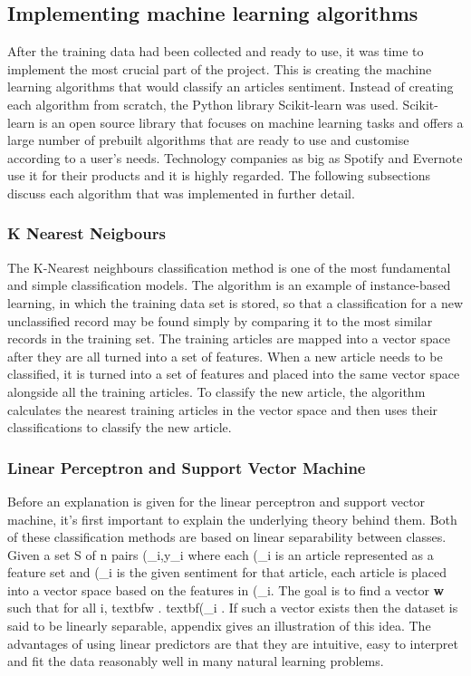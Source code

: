 \documentclass[a4paper,11pt]{report}
\begin{document}
\subsection{Implementing machine learning algorithms}
After the training data had been collected and ready to use, it was time to implement the most crucial part of the project. This is creating the machine learning algorithms that would classify an articles sentiment. Instead of creating each algorithm from scratch, the Python library Scikit-learn was used.  Scikit-learn is an open source library that focuses on machine learning tasks and offers a large number of prebuilt algorithms that are ready to use and customise according to a user's needs. Technology companies as big as Spotify and Evernote use it for their products and it is highly regarded. The following subsections discuss each algorithm that was implemented in further detail.

\subsubsection{K Nearest Neigbours}
The K-Nearest neighbours classification method is one of the most fundamental and simple classification models. The algorithm is an example of instance-based learning, in which the training data set is stored, so that a classification for a new unclassified record may be found simply by comparing it to the most similar records in the training set. The training articles are mapped into a vector space after they are all turned into a set of features. When a new article needs to be classified, it is turned into a set of features and placed into the same vector space alongside all the training articles. To classify the new article, the algorithm calculates the nearest training articles in the vector space and then uses their classifications to classify the new article.

\subsubsection{Linear Perceptron and Support Vector Machine}
Before an explanation is given for the linear perceptron and support vector machine, it's first important to explain the underlying theory behind them. Both of these classification methods are based on linear separability between classes. Given a set S of n pairs (\x_i,y_i\) where each (\x_i\) is an article represented as a feature set and (\y_i\) is the given sentiment for that article,  each article is placed into a vector space based on the features in (\x_i\). The goal is to find a vector \textbf{w} such that for all i, textbf{w} . text{bf}(\x_i\) . If such a vector exists then the dataset is said to be linearly separable, appendix gives an illustration of this idea. The advantages of using linear predictors are that they are intuitive, easy to interpret and fit the data reasonably well in many natural learning problems.
\end{document}
